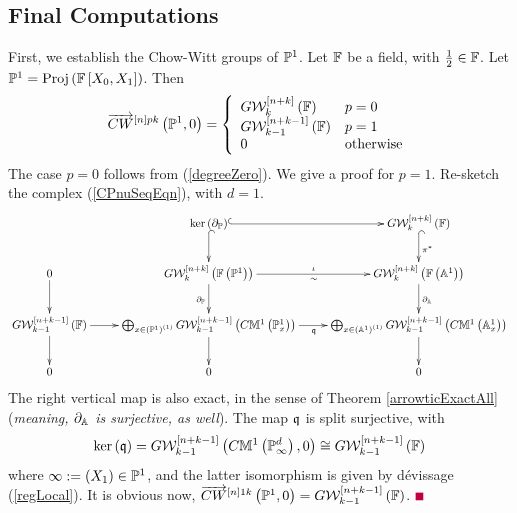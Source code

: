\documentclass[12pt]{article}
\begin{document}
\subsection{Final Computations} %
First, we establish the Chow-Witt groups of ${\BP}^1$.
%
\bL\label{POneAllOn}{\rm 
Let ${\BF}$ be a field, with $\frac{1}{2}\in {\BF}$. Let ${\BP}^1=\proj{{\BF}\LRt{X_0, X_1}}$. 
Then 
$$
\ora{CW}^{\LRt{n}pk}\LRf{{\BP}^1, 0} = 
\LBrace{{ll}
G{\CW}^{\LRt{n+k}}_k\LRf{{\BF}}&p=0 \\
G{\CW}^{\LRt{n+k-1}}_{k-1}\LRf{{\BF}}&p=1 \\
0 & {\rm otherwise}\\
}
$$ 
}
\eL
\pf The case $p=0$ follows from (\ref{degreeZero}). We give a proof for  $p=1$. Re-sketch the  complex
(\ref{CPnuSeqEqn}), with  $d=1$.
$$
  \diagram 
&\ker\LRf{\partial_{{\BP}}}\ar@{^(->}[d] \ar@{^(->}[r] &G{\CW}_k^{\LRt{n+k}}\LRf{{\BF}}\ar@{^(->}[d]^{\pi^*}\\
0\ar[d]&  G{\CW}_k^{\LRt{n+k}}\LRf{{\BF}\LRf{{\BP}^1}} \ar[r]^{\iota}_{\sim} \ar[d]_{\partial_{{\BP}}}& G{\CW}_k^{\LRt{n+k}}\LRf{{\BF}\LRf{{\BA}^1}}\ar[d]^{\partial_{{\BA}}} \\
G{\CW}^{\LRt{n+k-1}}_{k-1}\LRf{{\BF}}\ar[r]\ar[d]& \bigoplus_{x\in \LRf{{\BP}^1}^{\LRf{1}}}   G{\CW}_{k-1}^{\LRt{n+k-1}}\LRf{C{\BM}^1\LRf{{\BP}^1_x}} \ar[r]_{\q} \ar[d]& 
  \bigoplus_{x\in \LRf{{\BA}^1}^{\LRf{1}}} G{\CW}_{k-1}^{\LRt{n+k-1}}\LRf{C{\BM}^1\LRf{{\BA}^1_x}} \ar[d]\\
0  &0&0\\
  \enddiagram
$$
%
 The right vertical map is also exact, in the sense of Theorem \ref{arrowticExactAll} ({\it meaning, $\partial_{{\BA}}$ is surjective, as well}).  The map $\q$ is split surjective,
with 
$$
\ker\LRf{\q} = G{\CW}_{k-1}^{\LRt{n+k-1}}\LRf{C{\BM}^1\LRf{{\BP}^d_{\infty}}, 0} \cong G{\CW}^{\LRt{n+k-1}}_{k-1}\LRf{{\BF}}
$$
where $\infty:=\LRf{X_1}\in {\BP}^1$, and the latter isomorphism is given by d\'{e}vissage (\ref{regLocal}).
It is obvious now, $\ora{CW}^{\LRt{n}1k}\LRf{{\BP}^1, 0}=G{\CW}^{\LRt{n+k-1}}_{k-1}\LRf{{\BF}}$.
\pic $\eop$

\end{document}
